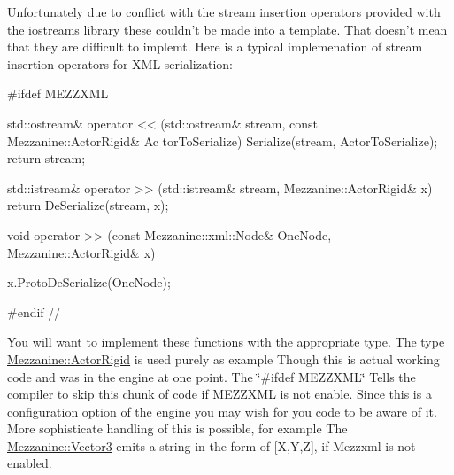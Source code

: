 Unfortunately due to conflict with the stream insertion operators provided with the iostreams library these couldn't be made into a template. That doesn't mean that they are difficult to implemt. Here is a typical implemenation of stream insertion operators for XML serialization: 
\begin{DoxyCode}
 #ifdef MEZZXML

 std::ostream& operator << (std::ostream& stream, const Mezzanine::ActorRigid& Ac
      torToSerialize)
 {
     Serialize(stream, ActorToSerialize);
     return stream;
 }

 std::istream& operator >> (std::istream& stream, Mezzanine::ActorRigid& x)
     { return DeSerialize(stream, x); }

 void operator >> (const Mezzanine::xml::Node& OneNode, Mezzanine::ActorRigid& x)
      
     { x.ProtoDeSerialize(OneNode); }

 #endif  // \Mezzxml
\end{DoxyCode}
 You will want to implement these functions with the appropriate type. The type \hyperlink{classMezzanine_1_1ActorRigid}{Mezzanine::ActorRigid} is used purely as example Though this is actual working code and was in the engine at one point. The \char`\"{}\#ifdef MEZZXML\char`\"{} Tells the compiler to skip this chunk of code if MEZZXML is not enable. Since this is a configuration option of the engine you may wish for you code to be aware of it. More sophisticate handling of this is possible, for example The \hyperlink{classMezzanine_1_1Vector3}{Mezzanine::Vector3} emits a string in the form of \mbox{[}X,Y,Z\mbox{]}, if Mezzxml is not enabled. \par
 \par
